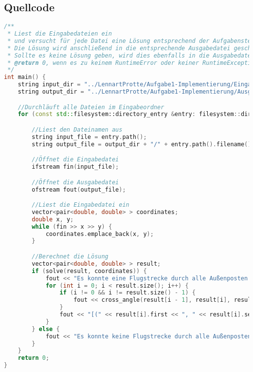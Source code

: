 \documentclass[a4paper,10pt,ngerman]{scrartcl}
\begin{document}
\begin{algorithm}[H]
        \section{Quellcode}
        \label{sec:quellcode}
        \label{LastPage}
        \begin{lstlisting}[frame=single,language=C++,title=Methode graphFromLines,breaklines=true]
    /**
 * Liest die Eingabedateien ein 
 * und versucht für jede Datei eine Lösung entsprechend der Aufgabenstellung zu finden
 * Die Lösung wird anschließend in die entsprechende Ausgabedatei geschrieben
 * Sollte es keine Lösung geben, wird dies ebenfalls in die Ausgabedatei geschrieben
 * @return 0, wenn es zu keinem RuntimeError oder keiner RuntimeException gekommen ist
 */
int main() {
    string input_dir = "../LennartProtte/Aufgabe1-Implementierung/Eingabedateien";
    string output_dir = "../LennartProtte/Aufgabe1-Implementierung/Ausgabedateien";

    //Durchläuft alle Dateien im Eingabeordner
    for (const std::filesystem::directory_entry &entry: filesystem::directory_iterator(input_dir)) {

        //Liest den Dateinamen aus
        string input_file = entry.path();
        string output_file = output_dir + "/" + entry.path().filename().string();

        //Öffnet die Eingabedatei
        ifstream fin(input_file);

        //Öffnet die Ausgabedatei
        ofstream fout(output_file);

        //Liest die Eingabedatei ein
        vector<pair<double, double> > coordinates;
        double x, y;
        while (fin >> x >> y) {
            coordinates.emplace_back(x, y);
        }

        //Berechnet die Lösung
        vector<pair<double, double> > result;
        if (solve(result, coordinates)) {
            fout << "Es konnte eine Flugstrecke durch alle Außenposten ermittelt werden" << endl;
            for (int i = 0; i < result.size(); i++) {
                if (i != 0 && i != result.size() - 1) {
                    fout << cross_angle(result[i - 1], result[i], result[i + 1]) << "° ";
                }
                fout << "[(" << result[i].first << ", " << result[i].second << ")] -> " << endl;
            }
        } else {
            fout << "Es konnte keine Flugstrecke durch alle Außenposten ermittelt werde" << endl;
        }
    }
    return 0;
}
        \end{lstlisting}


\end{algorithm}
\end{document}
